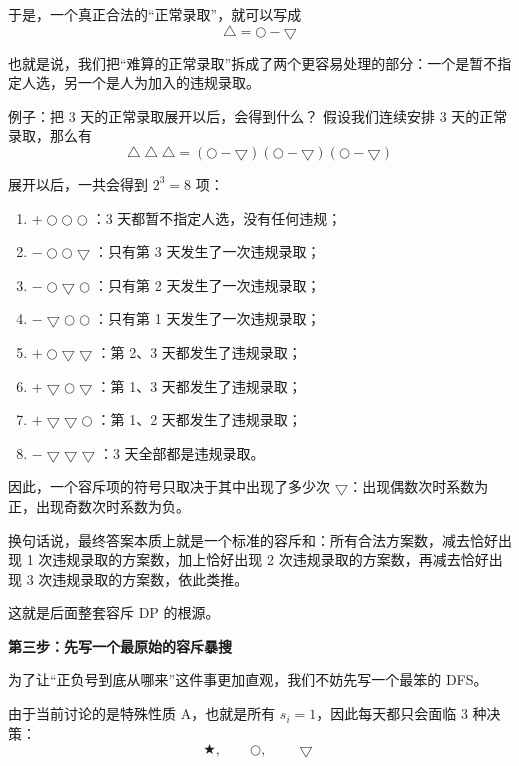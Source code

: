 \documentclass{book}
\newcommand{\NormalTake}{\ensuremath{\bigtriangleup}}
\newcommand{\FreeTake}{\ensuremath{\bigcirc}}
\newcommand{\BadTake}{\ensuremath{\bigtriangledown}}
\newcommand{\DropTake}{\ensuremath{\bigstar}}
\begin{document}
于是，一个真正合法的“正常录取”，就可以写成
\[
\NormalTake = \FreeTake - \BadTake
\]

也就是说，我们把“难算的正常录取”拆成了两个更容易处理的部分：一个是暂不指定人选，另一个是人为加入的违规录取。

\begin{examplebox}{例子：把 3 天的正常录取展开以后，会得到什么？}
假设我们连续安排 3 天的正常录取，那么有
\[
\NormalTake\NormalTake\NormalTake
=
(\FreeTake-\BadTake)(\FreeTake-\BadTake)(\FreeTake-\BadTake)
\]

展开以后，一共会得到 $2^3=8$ 项：
\begin{enumerate}[itemsep=1pt, topsep=2pt, parsep=0pt, partopsep=0pt]
    \item \textbf{$+\FreeTake\FreeTake\FreeTake$}：3 天都暂不指定人选，没有任何违规；
    \item \textbf{$-\FreeTake\FreeTake\BadTake$}：只有第 3 天发生了一次违规录取；
    \item \textbf{$-\FreeTake\BadTake\FreeTake$}：只有第 2 天发生了一次违规录取；
    \item \textbf{$-\BadTake\FreeTake\FreeTake$}：只有第 1 天发生了一次违规录取；
    \item \textbf{$+\FreeTake\BadTake\BadTake$}：第 2、3 天都发生了违规录取；
    \item \textbf{$+\BadTake\FreeTake\BadTake$}：第 1、3 天都发生了违规录取；
    \item \textbf{$+\BadTake\BadTake\FreeTake$}：第 1、2 天都发生了违规录取；
    \item \textbf{$-\BadTake\BadTake\BadTake$}：3 天全部都是违规录取。
\end{enumerate}

因此，一个容斥项的符号只取决于其中出现了多少次 $\BadTake$：出现偶数次时系数为正，出现奇数次时系数为负。

换句话说，最终答案本质上就是一个标准的容斥和：所有合法方案数，减去恰好出现 1 次违规录取的方案数，加上恰好出现 2 次违规录取的方案数，再减去恰好出现 3 次违规录取的方案数，依此类推。
\end{examplebox}

这就是后面整套容斥 DP 的根源。

\par\medskip
\noindent\textbf{第三步：先写一个最原始的容斥暴搜}
\par\medskip

为了让“正负号到底从哪来”这件事更加直观，我们不妨先写一个最笨的 DFS。

由于当前讨论的是特殊性质 A，也就是所有 $s_i=1$，因此每天都只会面临 3 种决策：
\[
\DropTake,\qquad \FreeTake,\qquad \BadTake
\]
\end{document}
